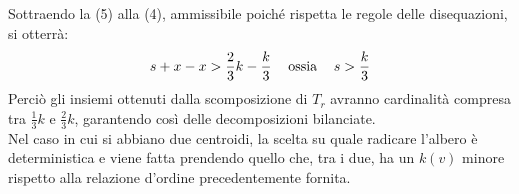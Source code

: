 \begin{itemize}
Sottraendo la (5) alla (4), ammissibile poich\'e rispetta le regole delle disequazioni, si otterr\`a:\\
\begin{equation}
	s + x - x > \frac{2}{3} k - \frac{k}{3} \hspace{0.3cm} \text{    ossia    }\hspace{0.3cm} s > \frac{k}{3}
\end{equation}
Perci\`o gli insiemi ottenuti dalla scomposizione di $T_r$ avranno cardinalit\`a compresa tra $\frac{1}{3} k$ e $\frac{2}{3} k$, garantendo cos\`i delle decomposizioni bilanciate.\\ 
Nel caso in cui si abbiano due centroidi, la scelta su quale radicare l’albero  \`e deterministica e  viene fatta prendendo quello che, tra i due, ha un $k(v)$ minore rispetto alla relazione d’ordine precedentemente fornita.


\end{itemize}
